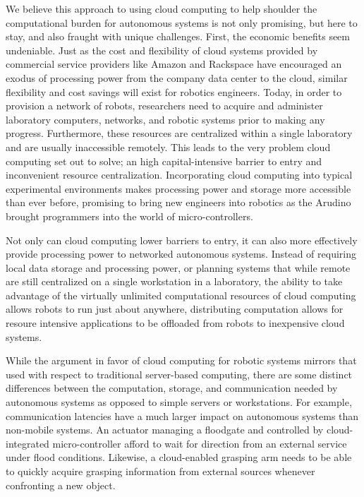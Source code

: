 \documentclass{sig-alternate}
\begin{document}
We believe this approach to using cloud computing to help shoulder the computational burden for autonomous systems is not only promising, but here to stay, and also fraught with unique challenges.  First, the economic benefits seem undeniable.  Just as the cost and flexibility of cloud systems provided by commercial service providers like Amazon and Rackspace have encouraged an exodus of processing power from the company data center to the cloud, similar flexibility and cost savings will exist for robotics engineers.  Today, in order to provision a network of robots, researchers need to acquire and administer laboratory computers, networks, and robotic systems prior to making any progress.  Furthermore, these resources are centralized within a single laboratory and are usually inaccessible remotely.  This leads to the very problem cloud computing set out to solve; an high capital-intensive barrier to entry and  inconvenient resource centralization.  Incorporating cloud computing into typical experimental environments makes processing power and storage more accessible than ever before, promising to bring new engineers into robotics as the Arudino brought programmers into the world of micro-controllers.  

Not only can cloud computing lower barriers to entry, it can also more effectively provide processing power to networked autonomous systems.  Instead of requiring local data storage and processing power, or planning systems that while remote are still centralized on a single workstation in a laboratory, the ability to take advantage of the virtually unlimited computational resources of cloud computing allows robots to run just about anywhere, distributing computation allows for resoure intensive applications to be offloaded from robots to inexpensive cloud systems.

While the argument in favor of cloud computing for robotic systems mirrors that used with respect to traditional server-based computing, there are some distinct differences between the computation, storage, and communication needed by autonomous systems as opposed to simple servers or workstations.  For example, communication latencies have a much larger impact on autonomous systems than non-mobile systems.  An actuator managing a floodgate and controlled by cloud-integrated micro-controller afford to wait for direction from an external service under flood conditions.  Likewise, a cloud-enabled grasping arm needs to be able to quickly acquire grasping information from external sources whenever confronting a new object.  
\end{document}
